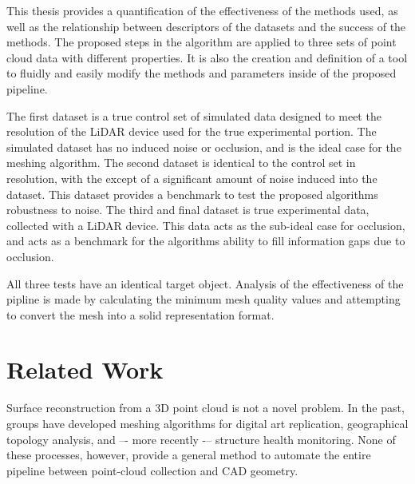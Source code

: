 \documentclass[12pt]{drexelthesis}
\let\Oldsection\section
\renewcommand{\section}{\FloatBarrier\Oldsection}
\let\Oldsubsection\subsection
\renewcommand{\subsection}{\FloatBarrier\Oldsubsection}
\begin{document}
This thesis provides a quantification of the effectiveness of the methods used, as well as the relationship between descriptors of the datasets and  the success of the methods. The proposed steps in the algorithm are applied to three sets of point cloud data with different properties. It is also the creation and definition of a tool to fluidly and easily modify the methods and parameters inside of the proposed pipeline.

The first dataset is a true control set of simulated data designed to meet the resolution of the LiDAR device used for the true experimental portion. The simulated dataset has no induced noise or occlusion, and is the ideal case for the meshing algorithm. The second dataset is identical to the control set in resolution, with the except of a significant amount of noise induced into the dataset. This dataset provides a benchmark to test the proposed algorithms robustness to noise. The third and final dataset is true experimental data, collected with a LiDAR device. This data acts as the sub-ideal case for occlusion, and acts as a benchmark for the algorithms ability to fill information gaps due to occlusion.

All three tests have an identical target object. Analysis of the effectiveness of the pipline is made by calculating the minimum mesh quality values and attempting to convert the mesh into a solid representation format. 

\section{Related Work}
\label{sec:related}
Surface reconstruction from a 3D point cloud is not a novel problem. In the past, groups have developed meshing algorithms for digital art replication, geographical topology analysis, and –- more recently -– structure health monitoring. None of these processes, however, provide a general method to automate the entire pipeline between point-cloud collection and CAD geometry.




\end{document}
